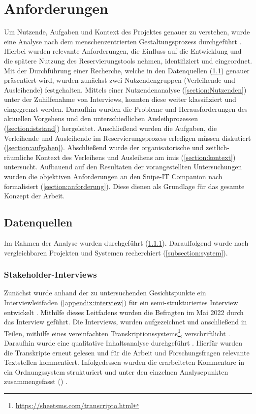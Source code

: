 \chapter{Anforderungen}
\label{chapter-analyse}

Um Nutzende, Aufgaben und Kontext des Projektes genauer zu verstehen, wurde eine
Analyse nach dem menschenzentrierten Gestaltungsprozess durchgeführt
\cite{DINISO9241}. Hierbei wurden relevante Anforderungen, die Einfluss auf die
Entwicklung und die spätere Nutzung des Reservierungstools nehmen, identifiziert
und eingeordnet. Mit der Durchführung einer Recherche, welche in den
Datenquellen (\ref{section:daten}) genauer präsentiert wird, wurden zunächst
zwei Nutzendengruppen (Verleihende und Ausleihende) festgehalten. Mittels einer
Nutzendenanalyse (\ref{section:Nutzenden}) unter der Zuhilfenahme von
Interviews, konnten diese weiter klassifiziert und eingegrenzt werden. Daraufhin
wurden die Probleme und Herausforderungen des aktuellen Vorgehens und den
unterschiedlichen Ausleihprozessen (\ref{section:iststand}) hergeleitet.
Anschließend wurden die Aufgaben, die Verleihende und Ausleihende im
Reservierungsprozess erledigen müssen diskutiert (\ref{section:aufgaben}).
Abschließend wurde der organisatorische und zeitlich-räumliche Kontext des
Verleihens und Ausleihens am \ac{imis} (\ref{section:kontext}) untersucht.
Aufbauend auf den Resultaten der vorangestellten Untersuchungen wurden die
objektiven Anforderungen an den Snipe-IT Companion nach 
formalisiert (\ref{section:anforderung}). Diese dienen als Grundlage für das
gesamte Konzept der Arbeit.

\section{Datenquellen}
\label{section:daten}
Im Rahmen der Analyse wurden  durchgeführt
(\ref{subsection:interview}). Darauffolgend wurde nach vergleichbaren Projekten
und Systemen recherchiert (\ref{subsection:system}).

\subsection{Stakeholder-Interviews}
\label{subsection:interview}
Zunächst wurde anhand der zu untersuchenden Gesichtspunkte ein
Interviewleitfaden (\ref{appendix:interview}) für ein semi-strukturiertes
Interview entwickelt \cite{blandford_qualitative_2016} . Mithilfe dieses
Leitfadens wurden die Befragten im Mai 2022 durch das Interview geführt. Die
Interviews, wurden aufgezeichnet und anschließend in Teilen, mithilfe eines
vereinfachten
Transkriptionssystems\footnote{\url{https://sheetsms.com/transcripto.html}},
verschriftlicht \cite{dresing_praxisbuch_2016}. Daraufhin wurde eine qualitative
Inhaltsanalyse durchgeführt \cite{dresing_praxisbuch_2016}. Hierfür wurden die
Transkripte erneut gelesen und für die Arbeit und Forschungsfragen relevante
Textstellen kommentiert. Infolgedessen wurden die erarbeiteten Kommentare in ein
Ordnungssystem strukturiert und unter den einzelnen Analysepunkten
zusammengefasst (\label{appendix:digitaleMedien})
\cite{dresing_praxisbuch_2016}.

